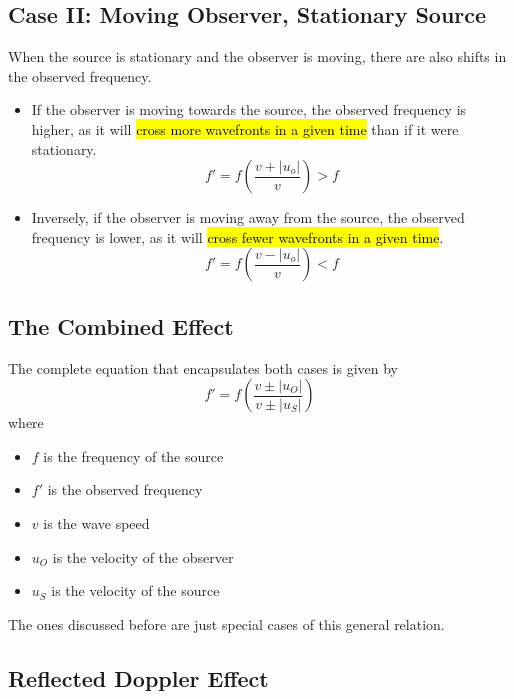 \documentclass[a4paper,12pt]{article}
\newcommand{\paren}[1]{\left(#1\right)}
\begin{document}
\pagebreak


\subsection{Case II: Moving Observer, Stationary Source}

When the source is stationary and the observer is moving, there are also shifts in the observed frequency.
\begin{itemize}
  \item If the observer is moving towards the source, the observed frequency is higher, as it will \hl{cross more wavefronts in a given time} than if it were stationary.
        \begin{equation}
          f' = f\paren{\frac{v + |u_o|}{v}} > f
        \end{equation}
  \item Inversely, if the observer is moving away from the source, the observed frequency is lower, as it will \hl{cross fewer wavefronts in a given time}.
        \begin{equation}
          f' = f\paren{\frac{v - |u_o|}{v}} < f
        \end{equation}
\end{itemize}

\subsection{The Combined Effect}

The complete equation that encapsulates both cases is given by
\begin{equation}
  f' = f\paren{\frac{v\pm |u_O|}{v\pm |u_S|}}
\end{equation}
where
\begin{itemize}
  \item $f$ is the frequency of the source
  \item $f'$ is the observed frequency
  \item $v$ is the wave speed
  \item $u_O$ is the velocity of the observer
  \item $u_S$ is the velocity of the source
\end{itemize}

The ones discussed before are just special cases of this general relation.

\subsection{Reflected Doppler Effect}
\end{document}

